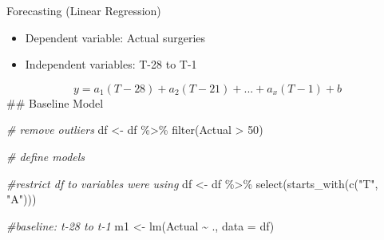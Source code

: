 \documentclass[
  ignorenonframetext,
]{beamer}
\newenvironment{Shaded}{\begin{snugshade}}{\end{snugshade}}
\newcommand{\AttributeTok}[1]{\textcolor[rgb]{0.77,0.63,0.00}{#1}}
\newcommand{\CommentTok}[1]{\textcolor[rgb]{0.56,0.35,0.01}{\textit{#1}}}
\newcommand{\DecValTok}[1]{\textcolor[rgb]{0.00,0.00,0.81}{#1}}
\newcommand{\FunctionTok}[1]{\textcolor[rgb]{0.00,0.00,0.00}{#1}}
\newcommand{\NormalTok}[1]{#1}
\newcommand{\OtherTok}[1]{\textcolor[rgb]{0.56,0.35,0.01}{#1}}
\newcommand{\SpecialCharTok}[1]{\textcolor[rgb]{0.00,0.00,0.00}{#1}}
\newcommand{\StringTok}[1]{\textcolor[rgb]{0.31,0.60,0.02}{#1}}
\providecommand{\tightlist}{%
  \setlength{\itemsep}{0pt}\setlength{\parskip}{0pt}}
\begin{document}
\begin{frame}[fragile]{Forecasting (Linear Regression)}
\protect\hypertarget{forecasting-linear-regression}{}
\begin{itemize}
\tightlist
\item
  Dependent variable: Actual surgeries
\item
  Independent variables: T-28 to T-1
\end{itemize}

\[
y = a_1(T-28) + a_2(T-21)+ ... + a_x(T - 1) + b
\] \#\# Baseline Model

\begin{Shaded}
\begin{Highlighting}[]
\CommentTok{\# remove outliers}
\NormalTok{df }\OtherTok{\textless{}{-}}\NormalTok{ df }\SpecialCharTok{\%\textgreater{}\%} 
  \FunctionTok{filter}\NormalTok{(Actual }\SpecialCharTok{\textgreater{}} \DecValTok{50}\NormalTok{)}
\end{Highlighting}
\end{Shaded}

\begin{Shaded}
\begin{Highlighting}[]
\CommentTok{\# define models}

\CommentTok{\#restrict df to variables we\textquotesingle{}re using}
\NormalTok{df }\OtherTok{\textless{}{-}}\NormalTok{ df }\SpecialCharTok{\%\textgreater{}\%} 
  \FunctionTok{select}\NormalTok{(}\FunctionTok{starts\_with}\NormalTok{(}\FunctionTok{c}\NormalTok{(}\StringTok{"T"}\NormalTok{, }\StringTok{"A"}\NormalTok{)))}

\CommentTok{\#baseline: t{-}28 to t{-}1}
\NormalTok{m1 }\OtherTok{\textless{}{-}} \FunctionTok{lm}\NormalTok{(Actual }\SpecialCharTok{\textasciitilde{}}\NormalTok{ ., }\AttributeTok{data =}\NormalTok{ df)}
\end{Highlighting}
\end{Shaded}


\end{frame}
\end{document}
